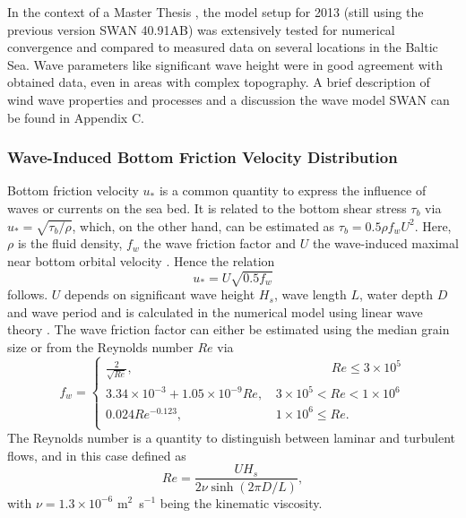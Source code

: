 In the context of a Master Thesis \citep[][]{masterarbeitronja}, the model 
setup for 2013 (still using the previous version SWAN 40.91AB) was 
extensively tested for numerical convergence and compared to measured data on 
several locations in the Baltic Sea. Wave parameters like significant wave 
height were in good agreement with obtained data, even in areas with complex 
topography. A brief description of wind wave properties and processes and a 
discussion the wave model SWAN can be found in Appendix C.

\subsubsection{Wave-Induced Bottom Friction Velocity Distribution}

Bottom friction velocity $u_\ast$ is a common quantity to express the influence 
of waves or currents on the sea bed. It is related to the bottom shear stress 
$\tau_b$ via $u_\ast = \sqrt{\tau_b \slash \rho}$, which, on the other hand, 
can 
be estimated as $\tau_b = 0.5 \rho f_w U^2$. Here, $\rho$ is the fluid 
density, $f_w$ the wave friction factor and $U$ the wave-induced
maximal near bottom orbital velocity \citep[][]{schwartz2006}. Hence the 
relation
\begin{equation}
 \label{ustar}
 u_\ast = U \sqrt{0.5 f_w}
\end{equation}
follows. $U$ depends on significant wave height $H_s$, wave length 
$L$, water depth $D$ and wave period and is calculated in the numerical 
model using linear wave theory \citep[][]{holthuijsen2007, schwartz2006}. The 
wave friction factor can either be estimated using the median grain size 
\citep[][]{swart1974, nielsen1992} or from the Reynolds number $Re$ 
\citep[][definition below]{nielsen1992, jonsson2004} via
\begin{equation}
 \label{fw}
 f_w = \left\{ \begin{array}{lll}
             \frac{2}{\sqrt{Re}}, & \qquad \qquad \; \,  Re \leq 3 \times 10^5 
\\
              3.34 \times 10^{-3} + 1.05 \times 10^{-9} Re, \, &3 \times 10^5 < 
							  Re < 1 \times 10^6 \\
	      0.024 Re^{-0.123}, \, &1 \times 10^6 \leq Re. \\
              \end{array} 
              \right. 
\end{equation}
The Reynolds number is a quantity to distinguish between laminar and turbulent 
flows, and in this case defined as
\begin{equation}
 \label{reynolds}
 Re = \frac{U H_s}{2 \nu \sinh (2 \pi D \slash L) },
\end{equation}
with $\nu = 1.3 \times 10^{-6}$ m$^2$~s$^{-1}$ being the kinematic viscosity.

